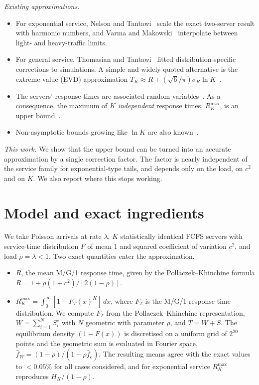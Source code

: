 \documentclass[11pt]{article}
\begin{document}
\textit{Existing approximations.}
\begin{itemize}
\item For exponential service, Nelson and Tantawi~\cite{NelsonTantawi1988} scale the exact two-server result with
harmonic numbers, and Varma and Makowski~\cite{VarmaMakowski1994} interpolate between light- and heavy-traffic limits.
\item For general service, Thomasian and Tantawi~\cite{ThomasianTantawi1994} fitted distribution-specific corrections
to simulations. A simple and widely quoted alternative is the extreme-value (EVD) approximation
$T_K\approx R+(\sqrt6/\pi)\sigma_R\ln K$~\cite{Thomasian2014,ThomasianRAID}.
\item The servers' response times are associated random variables~\cite{Baccelli1989}. As a consequence, the maximum
of $K$ \emph{independent} response times, $R^{\max}_K$, is an upper bound~\cite{NelsonTantawi1988,Baccelli1989}.
\item Non-asymptotic bounds growing like $\ln K$ are also known~\cite{Rizk2015}.
\end{itemize}

\textit{This work.} We show that the upper bound can be turned into an accurate approximation by a single correction
factor. The factor is nearly independent of the service family for exponential-type tails, and depends only on the
load, on $c^2$ and on $K$. We also report where this stops working.

\section{Model and exact ingredients}

We take Poisson arrivals at rate $\lambda$, $K$ statistically identical FCFS servers with service-time distribution
$F$ of mean 1 and squared coefficient of variation $c^2$, and load $\rho=\lambda<1$. Two exact quantities enter the
approximation.

\begin{itemize}
\item $R$, the mean M/G/1 response time, given by the Pollaczek--Khinchine formula
$R=1+\rho(1+c^2)/[2(1-\rho)]$.
\item $R^{\max}_K=\int_0^\infty[1-F_T(x)^K]\,dx$, where $F_T$ is the M/G/1 response-time distribution. We compute
$F_T$ from the Pollaczek--Khinchine representation, $W=\sum_{i=1}^{N}S^e_i$ with $N$ geometric with parameter
$\rho$, and $T=W+S$. The equilibrium density $(1-F(x))$ is discretised on a uniform grid of $2^{20}$ points and the
geometric sum is evaluated in Fourier space, $\hat f_W=(1-\rho)/(1-\rho\hat f_e)$. The resulting means agree with the
exact values to $<0.05\%$ for all cases considered, and for exponential service $R^{\max}_K$ reproduces
$H_K/(1-\rho)$.
\end{itemize}
\end{document}
